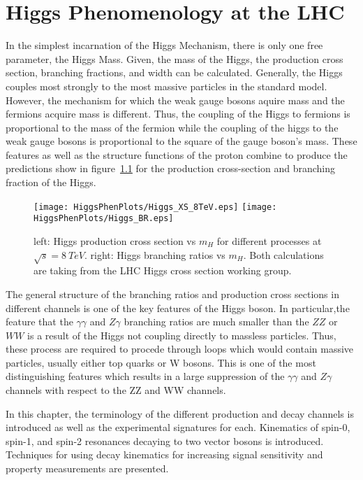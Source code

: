 \chapter{Higgs Phenomenology at the LHC}
\label{sec:HiggsPhen}

In the simplest incarnation of the Higgs Mechanism, there is only one free
parameter, the Higgs Mass.  Given, the mass of the Higgs, the production
cross section, branching fractions, and width can be calculated. 
Generally, the Higgs 
couples most strongly to the most massive particles in the standard model.  
However, the mechanism for which the weak gauge bosons aquire mass and the 
fermions acquire mass is different.  Thus, the coupling of the Higgs to 
fermions is proportional to the mass of the fermion while the coupling of the 
higgs to the weak gauge bosons is proportional to the square of the gauge 
boson's mass. These features as well as the structure functions of the proton 
combine to produce the predictions show in figure~\ref{fig:HiggsProdXS} 
for the production 
cross-section and branching fraction of the Higgs.  
\begin{figure}
\begin{center}
\texttt{[image: HiggsPhenPlots/Higgs\_XS\_8TeV.eps]}
\texttt{[image: HiggsPhenPlots/Higgs\_BR.eps]}
\label{fig:HiggsProdXS}
\caption{left: Higgs production cross section vs $m_H$ for 
different processes at $\sqrt{s}=8~TeV$. right: Higgs branching
ratios vs $m_H$.  Both calculations are taking from the LHC Higgs
cross section working group. }
\end{center}
\end{figure}
The general structure of the branching ratios and production cross 
sections in different channels is one of the key features of the Higgs 
boson.  In particular,the feature that the $\gamma\gamma$ and $Z\gamma$
branching ratios are much smaller than the $ZZ$ or $WW$ is a result 
of the Higgs not coupling directly to massless particles.  Thus, these
process are required to procede through loops which would contain massive
particles, usually either top quarks or W bosons.  This is one of the 
most distinguishing features which results in a large suppression of 
the $\gamma\gamma$ and $Z\gamma$ channels with respect to the ZZ and WW
channels.

In this chapter, the 
terminology of the different production and decay channels is introduced as 
well as the experimental signatures for each.  Kinematics of spin-0, spin-1, 
and spin-2 resonances decaying to two vector bosons is introduced.  
Techniques for using decay kinematics for increasing signal sensitivity
and property measurements are presented.  

